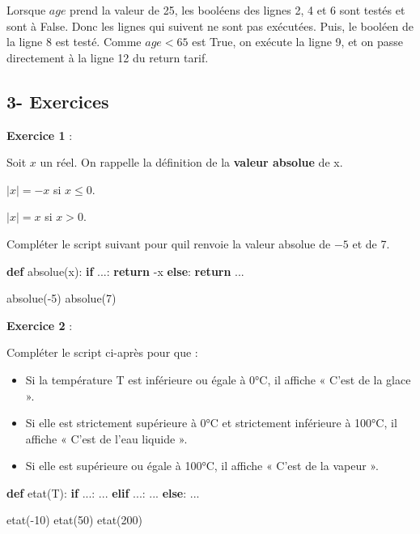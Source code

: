 \documentclass[
  paper=a4,
  ,captions=tableheading
]{scrartcl}
\newenvironment{Shaded}{}{}
\newcommand{\ControlFlowTok}[1]{\textcolor[rgb]{0.00,0.44,0.13}{\textbf{#1}}}
\newcommand{\DecValTok}[1]{\textcolor[rgb]{0.25,0.63,0.44}{#1}}
\newcommand{\KeywordTok}[1]{\textcolor[rgb]{0.00,0.44,0.13}{\textbf{#1}}}
\newcommand{\NormalTok}[1]{#1}
\newcommand{\OperatorTok}[1]{\textcolor[rgb]{0.40,0.40,0.40}{#1}}
\providecommand{\tightlist}{%
  \setlength{\itemsep}{0pt}\setlength{\parskip}{0pt}}
\begin{document}
Lorsque \(age\) prend la valeur de 25, les booléens des lignes 2, 4 et 6
sont testés et sont à False. Donc les lignes qui suivent ne sont pas
exécutées. Puis, le booléen de la ligne 8 est testé. Comme \(age<65\)
est True, on exécute la ligne 9, et on passe directement à la ligne 12
du return tarif.

\hypertarget{3--exercices}{%
\subsection{3- Exercices}\label{3--exercices}}

\textbf{Exercice 1} :

Soit \(x\) un réel. On rappelle la définition de la \textbf{valeur
absolue} de x.

\(\left | x \right |=-x\) si \(x\le0\).

\(\left | x \right |=x\) si \(x>0\).

Compléter le script suivant pour qu\textquotesingle il renvoie la valeur
absolue de \(-5\) et de 7.

\begin{Shaded}
\begin{Highlighting}[]
\KeywordTok{def}\NormalTok{ absolue(x):}
    \ControlFlowTok{if}\NormalTok{ ...:}
        \ControlFlowTok{return} \OperatorTok{{-}}\NormalTok{x}
    \ControlFlowTok{else}\NormalTok{:}
        \ControlFlowTok{return}\NormalTok{ ...}


\NormalTok{absolue(}\OperatorTok{{-}}\DecValTok{5}\NormalTok{)}
\NormalTok{absolue(}\DecValTok{7}\NormalTok{)}
\end{Highlighting}
\end{Shaded}

\textbf{Exercice 2} :

Compléter le script ci-après pour que :

\begin{itemize}
\tightlist
\item
  Si la température T est inférieure ou égale à 0°C, il affiche « C'est
  de la glace ».
\item
  Si elle est strictement supérieure à 0°C et strictement inférieure à
  100°C, il affiche « C'est de l'eau liquide ».
\item
  Si elle est supérieure ou égale à 100°C, il affiche « C'est de la
  vapeur ».
\end{itemize}

\begin{Shaded}
\begin{Highlighting}[]
\KeywordTok{def}\NormalTok{ etat(T):}
    \ControlFlowTok{if}\NormalTok{ ...:}
\NormalTok{        ...}
    \ControlFlowTok{elif}\NormalTok{ ...:}
\NormalTok{        ...}
    \ControlFlowTok{else}\NormalTok{:}
\NormalTok{        ...}


\NormalTok{etat(}\OperatorTok{{-}}\DecValTok{10}\NormalTok{)}
\NormalTok{etat(}\DecValTok{50}\NormalTok{)}
\NormalTok{etat(}\DecValTok{200}\NormalTok{)}
\end{Highlighting}
\end{Shaded}
\end{document}
